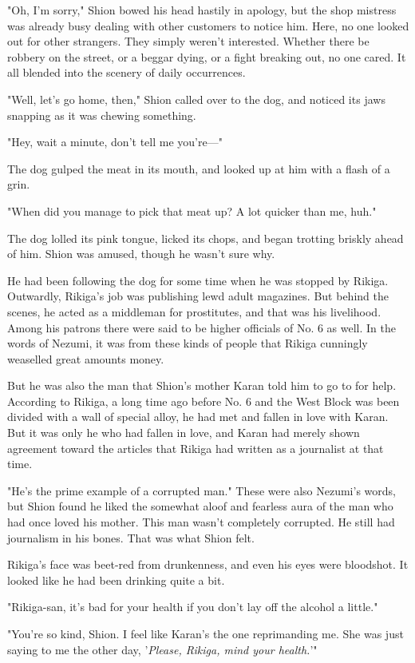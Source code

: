 "Oh, I'm sorry," Shion bowed his head hastily in apology, but the shop
mistress was already busy dealing with other customers to notice him.
Here, no one looked out for other strangers. They simply weren't
interested. Whether there be robbery on the street, or a beggar dying,
or a fight breaking out, no one cared. It all blended into the scenery
of daily occurrences.

"Well, let's go home, then," Shion called over to the dog, and noticed
its jaws snapping as it was chewing something.

"Hey, wait a minute, don't tell me you're---"

The dog gulped the meat in its mouth, and looked up at him with a flash
of a grin.

"When did you manage to pick that meat up? A lot quicker than me, huh."

The dog lolled its pink tongue, licked its chops, and began trotting
briskly ahead of him. Shion was amused, though he wasn't sure why.

He had been following the dog for some time when he was stopped by
Rikiga. Outwardly, Rikiga's job was publishing lewd adult magazines. But
behind the scenes, he acted as a middleman for prostitutes, and that was
his livelihood. Among his patrons there were said to be higher officials
of No. 6 as well. In the words of Nezumi, it was from these kinds of
people that Rikiga cunningly weaselled great amounts money.

But he was also the man that Shion's mother Karan told him to go to for
help. According to Rikiga, a long time ago before No. 6 and the West
Block was been divided with a wall of special alloy, he had met and
fallen in love with Karan. But it was only he who had fallen in love,
and Karan had merely shown agreement toward the articles that Rikiga had
written as a journalist at that time.

"He's the prime example of a corrupted man." These were also Nezumi's
words, but Shion found he liked the somewhat aloof and fearless aura of
the man who had once loved his mother. This man wasn't completely
corrupted. He still had journalism in his bones. That was what Shion
felt.

Rikiga's face was beet-red from drunkenness, and even his eyes were
bloodshot. It looked like he had been drinking quite a bit.

"Rikiga-san, it's bad for your health if you don't lay off the alcohol a
little."

"You're so kind, Shion. I feel like Karan's the one reprimanding me. She
was just saying to me the other day, '\emph{Please, Rikiga, mind your
health.}'"

